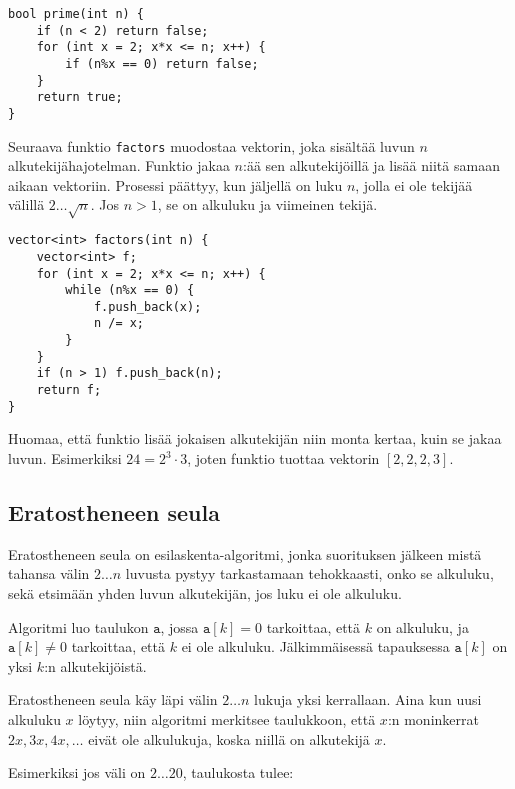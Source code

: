 \begin{lstlisting}
bool prime(int n) {
    if (n < 2) return false;
    for (int x = 2; x*x <= n; x++) {
        if (n%x == 0) return false;
    }
    return true;
}
\end{lstlisting}

\noindent
Seuraava funktio \texttt{factors} muodostaa
vektorin, joka sisältää luvun $n$
alkutekijähajotelman.
Funktio jakaa $n$:ää sen alkutekijöillä ja lisää
niitä samaan aikaan vektoriin.
Prosessi päättyy, kun jäljellä on luku $n$,
jolla ei ole tekijää välillä $2 \ldots \sqrt n$.
Jos $n>1$, se on alkuluku ja viimeinen tekijä.

\begin{lstlisting}
vector<int> factors(int n) {
    vector<int> f;
    for (int x = 2; x*x <= n; x++) {
        while (n%x == 0) {
            f.push_back(x);
            n /= x;
        }
    }
    if (n > 1) f.push_back(n);
    return f;
}
\end{lstlisting}

Huomaa, että funktio lisää jokaisen alkutekijän
niin monta kertaa, kuin se jakaa luvun.
Esimerkiksi $24=2^3 \cdot 3$,
joten funktio tuottaa vektorin $[2,2,2,3]$.

\subsection{Eratostheneen seula}

Eratostheneen seula on esilaskenta-algoritmi,
jonka suorituksen jälkeen mistä tahansa
välin $2 \ldots n$ luvusta pystyy tarkastamaan
tehokkaasti, onko se alkuluku,
sekä etsimään yhden luvun alkutekijän,
jos luku ei ole alkuluku.

Algoritmi luo taulukon $\texttt{a}$,
jossa $\texttt{a}[k]=0$ tarkoittaa,
että $k$ on alkuluku,
ja $\texttt{a}[k] \neq 0$ tarkoittaa,
että $k$ ei ole alkuluku.
Jälkimmäisessä tapauksessa $\texttt{a}[k]$
on yksi $k$:n alkutekijöistä.

Eratostheneen seula käy läpi välin
$2 \ldots n$ lukuja yksi kerrallaan.
Aina kun uusi alkuluku $x$ löytyy,
niin algoritmi merkitsee taulukkoon, että $x$:n moninkerrat
$2x,3x,4x,\ldots$ eivät ole alkulukuja,
koska niillä on alkutekijä $x$.

\noindent
Esimerkiksi jos väli on $2 \ldots 20$,
taulukosta tulee:

